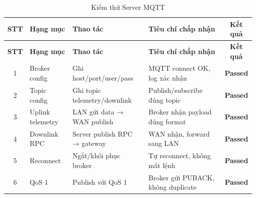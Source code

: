         \begin{longtable}{|c|p{}|p{}|p{}|c|}
            \caption{Kiểm thử Server MQTT}
            \label{tab:test_mqtt} \\
            \hline
            \textbf{STT} & \textbf{Hạng mục} & \textbf{Thao tác} & \textbf{Tiêu chí chấp nhận} & \textbf{Kết quả} \\ \hline
            \endfirsthead
        
            \hline
            \textbf{STT} & \textbf{Hạng mục} & \textbf{Thao tác} & \textbf{Tiêu chí chấp nhận} & \textbf{Kết quả} \\ \hline
            \endhead
        
            \hline
            \endfoot
            \endlastfoot
        
            1 & Broker config & Ghi host/port/user/pass & MQTT connect OK, log xác nhận & \textcolor{modern_blue}{\textbf{Passed}} \\ \hline
            2 & Topic config & Ghi topic telemetry/downlink & Publish/subscribe đúng topic & \textcolor{modern_blue}{\textbf{Passed}} \\ \hline
            3 & Uplink telemetry & LAN gửi data → WAN publish & Broker nhận payload đúng format & \textcolor{modern_blue}{\textbf{Passed}} \\ \hline
            4 & Downlink RPC & Server publish RPC → gateway & WAN nhận, forward sang LAN & \textcolor{modern_blue}{\textbf{Passed}} \\ \hline
            5 & Reconnect & Ngắt/khôi phục broker & Tự reconnect, không mất lệnh & \textcolor{modern_blue}{\textbf{Passed}} \\ \hline
            6 & QoS 1 & Publish với QoS 1 & Broker gửi PUBACK, không duplicate & \textcolor{modern_blue}{\textbf{Passed}} \\ \hline
        \end{longtable}
        
